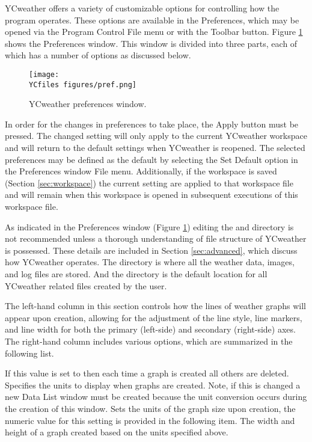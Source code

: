 \label{sec:pref}
YCweather offers a variety of customizable options for controlling how the program operates.  These options are available in the Preferences, which may be opened via the Program Control File menu or with the Toolbar button.  Figure \ref{fig:pref} shows the Preferences window.  This window is divided into three parts, each of which has a number of options as discussed below.

\begin{figure}[h]\centering
	\texttt{[image: \\YCfiles figures/pref.png]}
	\caption{YCweather preferences window.}
	\label{fig:pref}
\end{figure}

In order for the changes in preferences to take place, the Apply button must be pressed.  The changed setting will only apply to the current YCweather workspace and will return to the default settings when YCweather is reopened.  The selected preferences may be defined as the default by selecting the Set Default option in the Preferences window File menu.  Additionally, if the workspace is saved (Section \ref{sec:workspace}) the current setting are applied to that workspace file and will remain when this workspace is opened in subsequent executions of this workspace file.

As indicated in the Preferences window (Figure \ref{fig:pref}) editing the  and  directory is not recommended unless a thorough understanding of file structure of YCweather is possessed.  These details are included in Section \ref{sec:advanced}, which discuss how YCweather operates. The  directory is where all the weather data, images, and log files are stored.  And the  directory is the default location for all YCweather related files created by the user.

The left-hand column in this section controls how the lines of weather graphs will appear upon creation, allowing for the adjustment of the line style, line markers, and line width for both the primary (left-side) and secondary (right-side) axes. The right-hand column includes various options, which are summarized in the following list.
\begin{itemize}
      If this value is set to  then each time a graph is created all others are deleted.
      Specifies the units to display when graphs are created.  Note, if this is changed a new Data List window must be created because the unit conversion occurs during the creation of this window.
      Sets the units of the graph size upon creation, the numeric value for this setting is provided in the following item.
      The width and height of a graph created based on the units specified above.
\end{itemize}

